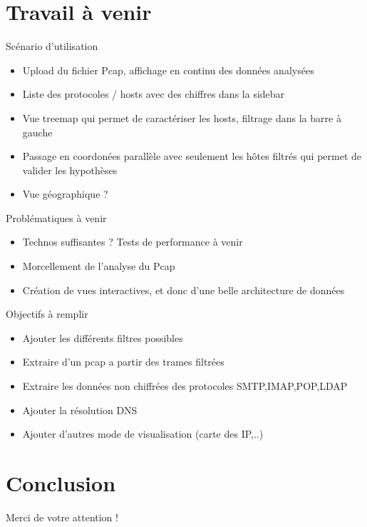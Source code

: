 \documentclass{beamer}
\begin{document}

  \section{Travail à venir}
  \begin{frame}
    Scénario d'utilisation
    \begin{itemize}
     \item Upload du fichier Pcap, affichage en continu des données analysées
     \item Liste des protocoles / hosts avec des chiffres dans la sidebar
     \item Vue treemap qui permet de caractériser les hosts, filtrage dans la
     barre à gauche
     \item Passage en coordonées parallèle avec seulement les hôtes filtrés qui
     permet de valider les hypothèses
     \item Vue géographique ?
    \end{itemize}
  \end{frame}
  
  \begin{frame}
    Problématiques à venir
    \begin{itemize}
     \item Technos suffisantes ? Tests de performance à venir
     \item Morcellement de l'analyse du Pcap
     \item Création de vues interactives, et donc d'une belle architecture de
     données
     \end{itemize}
  \end{frame}
  
  \begin{frame}
    Objectifs à remplir
    \begin{itemize}
     \item Ajouter les différents filtres possibles
     \item Extraire d'un pcap a partir des trames filtrées
     \item Extraire les données non chiffrées des protocoles SMTP,IMAP,POP,LDAP
     \item Ajouter la résolution DNS
     \item Ajouter d'autres mode de visualisation (carte des IP,..)
    \end{itemize}
  \end{frame}


  \section{Conclusion}
  \begin{frame}
    \begin{center}
      Merci de votre attention !
    \end{center}
  \end{frame}
\end{document}
